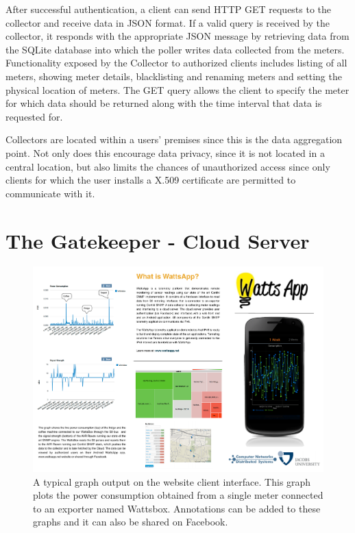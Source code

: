 \documentclass[10pt, conference, compsocconf]{IEEEtran}
\begin{document}
After successful authentication, a client can send HTTP GET requests
to the collector and receive data in JSON format. If a valid query
is received by the collector, it responds with the appropriate JSON
message by retrieving data from the SQLite database into which the
poller writes data collected from the meters. Functionality exposed
by the Collector to authorized clients includes listing of all meters,
showing meter details, blacklisting and renaming meters and setting
the physical location of meters. The GET query allows the client to
specify the meter for which data should be returned along with the
time interval that data is requested for.

Collectors are located within a users' premises since this is the
data aggregation point. Not only does this encourage data privacy,
since it is not located in a central location, but also limits the
chances of unauthorized access since only clients for which the user
installs a X.509 certificate are permitted to communicate with it.


\section{The Gatekeeper - Cloud Server}

\begin{figure}[t]
\begin{centering}
\includegraphics[scale=0.93]{images/power-consumption} 
\par\end{centering}

\caption{A typical graph output on the website client interface. This graph
plots the power consumption obtained from a single meter connected
to an exporter named Wattsbox. Annotations can be added to these graphs
and it can also be shared on Facebook. }


\label{fig:website-power-consumption}
\end{figure}
\end{document}
